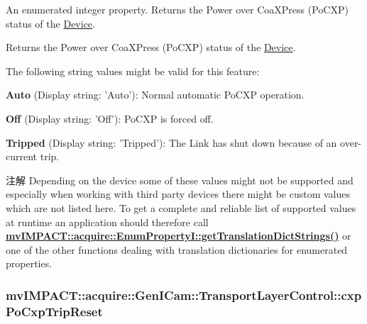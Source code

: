 An enumerated integer property. Returns the Power over Coa\+X\+Press (Po\+C\+X\+P) status of the \hyperlink{classmv_i_m_p_a_c_t_1_1acquire_1_1_device}{Device}. 

Returns the Power over Coa\+X\+Press (Po\+C\+X\+P) status of the \hyperlink{classmv_i_m_p_a_c_t_1_1acquire_1_1_device}{Device}.

The following string values might be valid for this feature\+:
\begin{DoxyItemize}
\item {\bfseries Auto} (Display string\+: 'Auto')\+: Normal automatic Po\+C\+X\+P operation.
\item {\bfseries Off} (Display string\+: 'Off')\+: Po\+C\+X\+P is forced off.
\item {\bfseries Tripped} (Display string\+: 'Tripped')\+: The Link has shut down because of an over-\/current trip.
\end{DoxyItemize}

\begin{DoxyNote}{注解}
Depending on the device some of these values might not be supported and especially when working with third party devices there might be custom values which are not listed here. To get a complete and reliable list of supported values at runtime an application should therefore call {\bfseries \hyperlink{classmv_i_m_p_a_c_t_1_1acquire_1_1_enum_property_i_a0ba6ccbf5ee69784d5d0b537924d26b6}{mv\+I\+M\+P\+A\+C\+T\+::acquire\+::\+Enum\+Property\+I\+::get\+Translation\+Dict\+Strings()}} or one of the other functions dealing with translation dictionaries for enumerated properties. 
\end{DoxyNote}
\hypertarget{classmv_i_m_p_a_c_t_1_1acquire_1_1_gen_i_cam_1_1_transport_layer_control_a8f65a0fd2c506615dff20133a3982b65}{
\subsubsection[{cxp\+Po\+Cxp\+Trip\+Reset}]{ mv\+I\+M\+P\+A\+C\+T\+::acquire\+::\+Gen\+I\+Cam\+::\+Transport\+Layer\+Control\+::cxp\+Po\+Cxp\+Trip\+Reset}}\label{classmv_i_m_p_a_c_t_1_1acquire_1_1_gen_i_cam_1_1_transport_layer_control_a8f65a0fd2c506615dff20133a3982b65}



